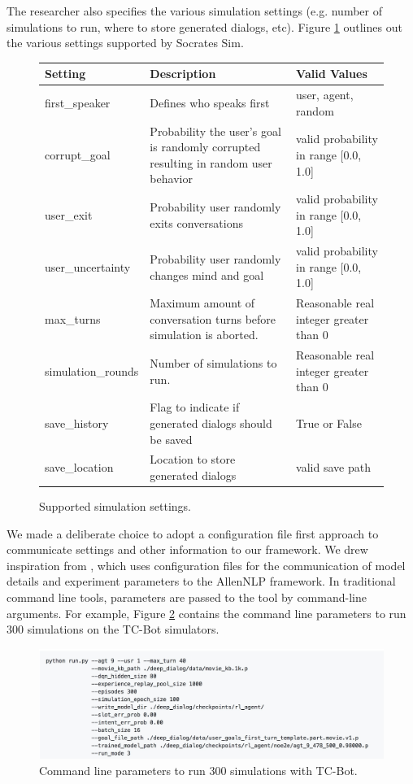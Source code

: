 The researcher also specifies the various simulation settings (e.g. number of simulations to run, where to store generated dialogs, etc). Figure \ref{fig:sim_settings} outlines out the various settings supported by Socrates Sim.

\begin{figure}[h!]
	\centering
	 \begin{tabular}{|l|p{5cm}|p{5cm}|}
		\hline 
		\textbf{Setting} &\textbf{ Description } & \textbf{Valid Values } \\ 
		\hline 
		first\_speaker & Defines who speaks first  & user, agent, random  \\ 
		\hline 
		corrupt\_goal & Probability the user's goal is randomly corrupted resulting in random user behavior  & valid probability in range [0.0, 1.0]  \\ 
		\hline 
		user\_exit & Probability user randomly exits conversations  & valid probability in range [0.0, 1.0]  \\ 
		\hline 
		user\_uncertainty & Probability user randomly changes mind and goal  & valid probability in range [0.0, 1.0]  \\ 
		\hline 
		max\_turns & Maximum amount of conversation turns before simulation is aborted.  &  Reasonable real integer greater than 0 \\ 
		\hline 
		simulation\_rounds & Number of simulations to run.  &  Reasonable real integer greater than 0 \\ 
		\hline 
		save\_history & Flag to indicate if generated dialogs should be saved & True or False  \\ 
		\hline 
		save\_location & Location to store generated dialogs  & valid save path  \\ 
		\hline 
	\end{tabular} 
	\caption{ Supported simulation settings.}
	\label{fig:sim_settings}
\end{figure}

We made a deliberate choice to adopt a configuration file first approach to communicate settings and other information to our framework. We drew inspiration from \cite{Gardner_allennlp}, which uses configuration files for the communication of model details and experiment parameters to the AllenNLP framework. In traditional command line tools, parameters are passed to the tool by command-line arguments. For example, Figure \ref{fig:cmd_line_ex} contains the command line parameters to run 300 simulations on the TC-Bot simulators. 

\begin{figure}[h!]
	\centering
	\includegraphics[scale=.25]{diagrams/cmd_line_ex.jpeg}
	\caption{ Command line parameters to run 300 simulations with TC-Bot. }
	\label{fig:cmd_line_ex}
\end{figure}

